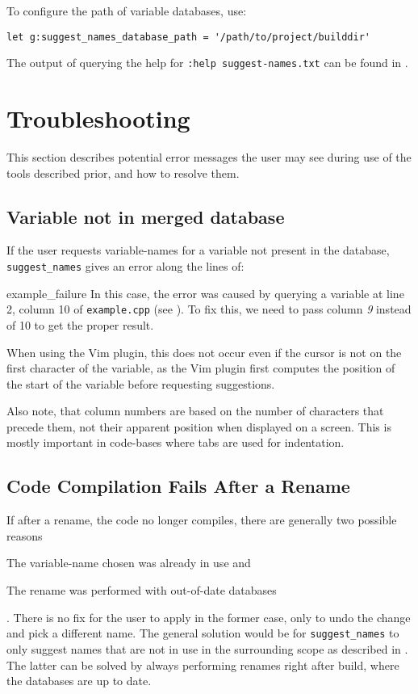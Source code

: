 To configure the path of variable databases, use:

\begin{lstlisting}[language=vimscript, caption={Setting Databases Path}]
let g:suggest_names_database_path = '/path/to/project/builddir'
\end{lstlisting}

The output of querying the help for \lstinline|:help suggest-names.txt| can be
found in .

\section{Troubleshooting}
\label{sec:troubleshooting}
This section describes potential error messages the user may see during use of
the tools described prior, and how to resolve them.

\subsection{Variable not in merged database}
If the user requests variable-names for a variable not present in the database,
\lstinline|suggest_names| gives an error along the lines of:


		{example_failure}
In this case, the error was caused by querying a variable at line 2, column 10
of \lstinline|example.cpp| (see ). To fix this, we need to
pass column \emph{9} instead of 10 to get the proper result.

When using the Vim plugin, this does not occur even if the cursor is not on the
first character of the variable, as the Vim plugin first computes the position
of the start of the variable before requesting suggestions.

Also note, that column numbers are based on the number of characters that
precede them, not their apparent position when displayed on a screen. This is
mostly important in code-bases where tabs are used for indentation.

\subsection{Code Compilation Fails After a Rename}
If after a rename, the code no longer compiles, there are generally two possible
reasons \begin{inparaenum}\item The variable-name chosen
was already in use and \item The rename was performed with out-of-date
databases\end{inparaenum}.
There is no fix for the user to apply in the former case, only to undo the
change and pick a different name. The general solution would be for
\lstinline|suggest_names| to only suggest names that are not in use in the
surrounding scope as described in .
The latter can be solved by always performing renames right after build, where
the databases are up to date.
